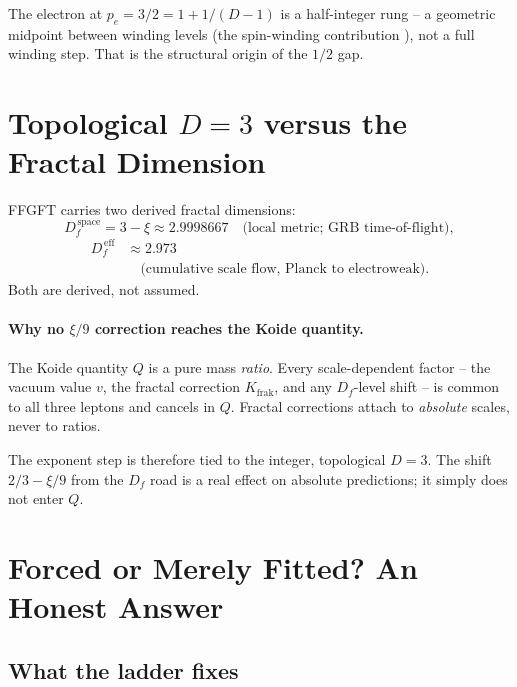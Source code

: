 The electron at \(p_e = 3/2 = 1 + 1/(D-1)\) is a half-integer rung --
a geometric midpoint between winding levels (the spin-winding contribution
\cite{PascherDok051}), not a full winding step. That is the structural origin of the \(1/2\) gap.

\section{Topological \(D=3\) versus the Fractal Dimension}
\label{sec:df}

FFGFT carries two derived fractal dimensions:
\begin{equation}
  D_f^{\,\text{space}} = 3 - \xi \approx 2.9998667
  \quad\text{(local metric; GRB time-of-flight)},
\end{equation}
\begin{align*}
  D_f^{\,\text{eff}} &\approx 2.973\\
  &\quad\text{(cumulative scale flow, Planck to electroweak)}.
\end{align*}
Both are derived, not assumed.

\paragraph{Why no \(\xi/9\) correction reaches the Koide quantity.}
The Koide quantity \(Q\) is a pure mass \emph{ratio}. Every scale-dependent
factor -- the vacuum value \(v\), the fractal correction
\(K_{\text{frak}}\),
and any \(D_f\)-level shift -- is common to all three leptons and cancels
in \(Q\). Fractal corrections attach to \emph{absolute} scales, never to
ratios.

The exponent step is therefore tied to the integer, topological \(D=3\).
The shift \(2/3 - \xi/9\) from the \(D_f\) road is a real effect on
absolute predictions; it simply does not enter \(Q\).

\section{Forced or Merely Fitted? An Honest Answer}

\subsection*{What the ladder fixes}

